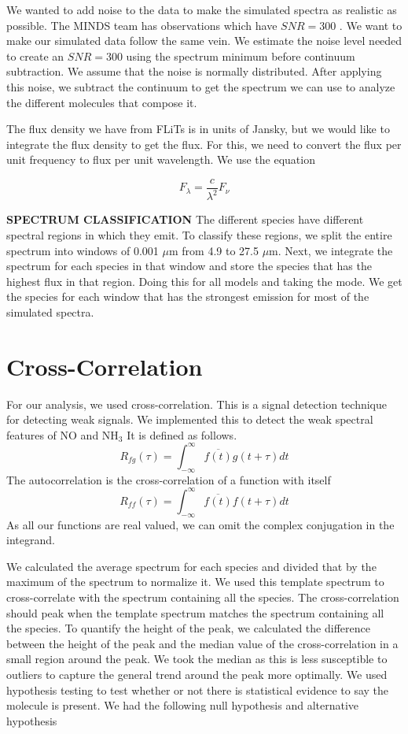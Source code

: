 \documentclass[oneside, single, authoryear, semicolon]{lion-msc}
\newcommand{\4}{$_4$}
\newcommand{\3}{$_3$}
\newcommand{\2}{$_2$}
\begin{document}
We wanted to add noise to the data to make the simulated spectra as realistic as possible. The MINDS team has observations which have $SNR = 300$ \citep{SOURCE}. We want to make our simulated data follow the same vein. We estimate the noise level needed to create an $SNR = 300$ using the spectrum minimum before continuum subtraction. We assume that the noise is normally distributed. After applying this noise, we subtract the continuum to get the spectrum we can use to analyze the different molecules that compose it.


The flux density we have from FLiTs is in units of Jansky, but we would like to integrate the flux density to get the flux. For this, we need to convert the flux per unit frequency to flux per unit wavelength. We use the equation

\begin{equation}
    F_\lambda=\frac{c}{\lambda^2}F_\nu
\end{equation}

\textbf{SPECTRUM CLASSIFICATION}
The different species have different spectral regions in which they emit. To classify these regions, we split the entire spectrum into windows of 0.001 $\mu$m from 4.9 to 27.5 $\mu$m. Next, we integrate the spectrum for each species in that window and store the species that has the highest flux in that region. Doing this for all models and taking the mode. We get the species for each window that has the strongest emission for most of the simulated spectra.  


\section{Cross-Correlation}
For our analysis, we used cross-correlation. This is a signal detection technique for detecting weak signals. We implemented this to detect the weak spectral features of NO and NH\3 It is defined as follows. 
\begin{equation}
    R_{fg}(\tau)=\int^\infty_{-\infty}\overline{f(t)}g(t+\tau)dt
\end{equation}
The autocorrelation is the cross-correlation of a function with itself
\begin{equation}
    R_{ff}(\tau)=\int^\infty_{-\infty}\overline{f(t)}f(t+\tau)dt
\end{equation}
As all our functions are real valued, we can omit the complex conjugation in the integrand.

We calculated the average spectrum for each species and divided that by the maximum of the spectrum to normalize it. We used this template spectrum to cross-correlate with the spectrum containing all the species. The cross-correlation should peak when the template spectrum matches the spectrum containing all the species. To quantify the height of the peak, we calculated the difference between the height of the peak and the median value of the cross-correlation in a small region around the peak. We took the median as this is less susceptible to outliers to capture the general trend around the peak more optimally. We used hypothesis testing to test whether or not there is statistical evidence to say the molecule is present. We had the following null hypothesis and alternative hypothesis
\end{document}

